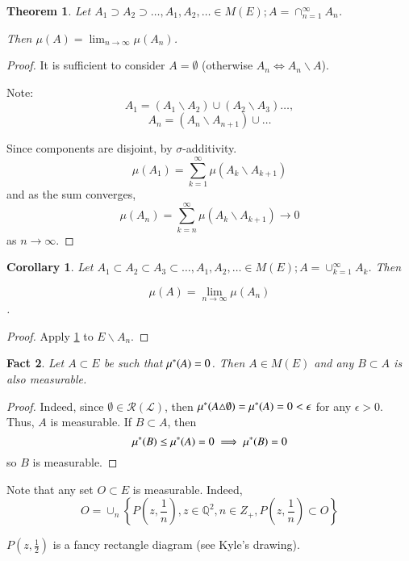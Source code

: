\documentclass[11pt,a4paper]{report}
\newtheorem{corollary}[theorem]{Corollary}
\theoremstyle{plain}
\newtheorem{thm}{Theorem}[section]
\newtheorem{fact}[thm]{Fact}
\theoremstyle{definition}
\theoremstyle{remark}
\newcommand{\union}{\cup}
\newcommand{\intersection}{\cap}
\newcommand{\Q}{\mathbb{Q}}
\newcommand{\cL}{\mathcal{L}}
\newcommand{\cR}{\mathcal{R}}
\begin{document}
\begin{thm}\label{convergence_of_sets_in_measure}
    Let $A_1 \supset A_2 \supset \dots, A_1, A_2, \dots \in M(E); A = \intersection_{n=1}^\infty A_n$.

    Then $\mu(A) = \lim_{n \rightarrow \infty} \mu(A_n)$.
\end{thm}

\begin{proof}
    It is sufficient to consider $A = \emptyset$ (otherwise $A_n \iff A_n \backslash A$).

    Note: $$ A_1 = (A_1 \backslash A_2) \union (A_2 \backslash A_3) \dots, $$
    $$ A_n = (A_n \backslash A_{n+1}) \union \dots$$
    
    Since components are disjoint, by $\sigma$-additivity.
    $$ \mu(A_1) = \sum_{k=1}^\infty \mu(A_k \backslash A_{k+1}) $$
    and as the sum converges,
    $$ \mu(A_n) = \sum_{k=n}^\infty \mu(A_k \backslash A_{k+1}) \rightarrow 0$$
    as $n \rightarrow \infty$.
\end{proof}

\begin{corollary}
  Let $A_1 \subset A_2 \subset A_3 \subset \dots, A_1, A_2, \dots \in M(E); A = \union_{k=1}^\infty A_k$. Then

    $$ \mu(A) = \lim_{n \rightarrow \infty} \mu(A_n)$$.
\end{corollary}

\begin{proof}
    Apply \ref{convergence_of_sets_in_measure} to $E \backslash A_n$.
\end{proof}

\begin{fact}
  Let $A \subset E$ be such that $\mu^{*}(A) = 0$. Then $A \in M(E)$ and any $B \subset A$ is also measurable.
\end{fact}

\begin{proof}
  Indeed, since $\emptyset \in \cR(\cL)$, then $\mu^{*}(A \triangle \emptyset) = \mu^{*}(A) = 0 < \epsilon$ for any $\epsilon > 0$.
  Thus, $A$ is measurable. If $B \subset A$, then
  $$ \mu^{*}(B) \leq \mu^{*}(A) = 0 \implies \mu^{*}(B) = 0$$
  so $B$ is measurable.
\end{proof}

Note that any set $O \subset E$ is measurable. Indeed, $$ O = \union_n \left\{ P (z, \frac{1}{n}), z \in \Q^2, n \in Z_{+}, P(z, \frac{1}{n}) \subset O \right\} $$

$P(z, \frac{1}{2})$ is a fancy rectangle diagram (see Kyle's drawing).
\end{document}
